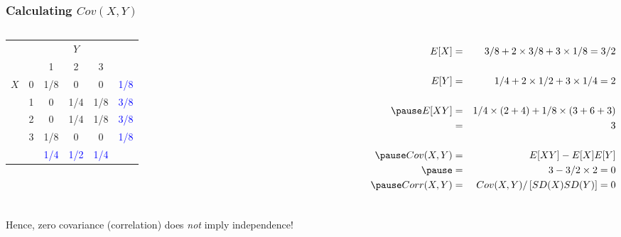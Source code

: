 \begin{frame}
\frametitle{Calculating $Cov(X,Y)$}

\begin{columns}

\begin{table}
\footnotesize
\begin{tabular}{|cc|ccc|c|}
\hline
&&\multicolumn{3}{c|}{$Y$}&\\
&&1 & 2&3&\\
\hline
\multirow{4}{*}{$X$}
&0& \multicolumn{1}{|c}{\alert{1/8}} & \alert{0}& \alert{0}&\textcolor{blue}{1/8}\\
&1& \multicolumn{1}{|c}{\alert{0}} & \alert{1/4}&\alert{1/8}&\textcolor{blue}{3/8}\\
&2& \multicolumn{1}{|c}{\alert{0}} & \alert{1/4}&\alert{1/8}&\textcolor{blue}{3/8}\\
&3& \multicolumn{1}{|c}{\alert{1/8}} & \alert{0}&\alert{0}&\textcolor{blue}{1/8}\\
\hline
&&\textcolor{blue}{1/4}&\textcolor{blue}{1/2}&\textcolor{blue}{1/4}&\\
\hline
\end{tabular}
\vspace{6em}
\end{table}


\footnotesize
\begin{eqnarray*}
	E[X] &=&3/8 + 2 \times 3/8 + 3 \times 1/8 = 3/2\\\\ 
	E[Y] &=&1/4 + 2 \times 1/2 + 3 \times 1/4 = 2 \\ \\ \pause
	E[XY] &=& 1/4\times ( 2 + 4) + 1/8 \times (3 + 6 + 3)\\ 
		&=& 3\\ \\ \pause
	Cov(X,Y) &=& E[XY] - E[X]E[Y]\\ \pause
			&=& 3 - 3/2\times 2 = 0\\ \pause
	Corr(X,Y) &=& Cov(X,Y)/\left[SD(X) SD(Y) \right] = 0
\end{eqnarray*}

\end{columns}

\vspace{1em}
\alert{Hence, zero covariance (correlation) does \emph{not} imply independence!}

\end{frame}
